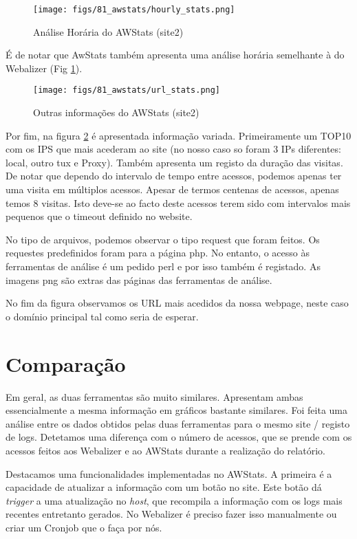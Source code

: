 \begin{figure}
    \centering
    \texttt{[image: figs/81\_awstats/hourly\_stats.png]}
    \caption{Análise Horária do AWStats (site2)}
    \label{fig:hourly_awstats}
\end{figure}

É de notar que AwStats também apresenta uma análise horária semelhante à do Webalizer (Fig \ref{fig:hourly_awstats}).

\begin{figure}
    \centering
    \texttt{[image: figs/81\_awstats/url\_stats.png]}
    \caption{Outras informações do AWStats (site2)}
    \label{fig:url_awstats}
\end{figure}

Por fim, na figura \ref{fig:url_awstats} é apresentada informação variada.
Primeiramente um TOP10 com os IPS que mais acederam ao site (no nosso caso so foram 3 IPs diferentes: local, outro tux e Proxy).
Também apresenta um registo da duração das visitas. De notar que dependo do intervalo de tempo entre acessos, podemos apenas ter uma visita
em múltiplos acessos. Apesar de termos centenas de acessos, apenas temos 8 visitas. Isto deve-se ao facto deste acessos terem sido com intervalos mais
pequenos que o timeout definido no website.

No tipo de arquivos, podemos observar o tipo request que foram feitos. Os requestes predefinidos foram para a página php. No entanto,
o acesso às ferramentas de análise é um pedido perl e por isso também é registado. As imagens png são extras das páginas das ferramentas de análise.

No fim da figura observamos os URL mais acedidos da nossa webpage, neste caso o domínio principal tal como seria de esperar.

\section{Comparação}
Em geral, as duas ferramentas são muito similares. Apresentam ambas essencialmente a mesma informação em gráficos bastante similares.
Foi feita uma análise entre os dados obtidos pelas duas ferramentas para o mesmo site / registo de logs.
Detetamos uma diferença com o número de acessos, que se prende com os acessos feitos aos Webalizer e ao AWStats durante a realização do relatório.

Destacamos uma funcionalidades implementadas no AWStats. A primeira é a capacidade de atualizar a informação com um botão no site.
Este botão dá \textit{trigger} a uma atualização no \textit{host}, que recompila a informação com os logs mais recentes entretanto gerados.
No Webalizer é preciso fazer isso manualmente ou criar um Cronjob que o faça por nós.

